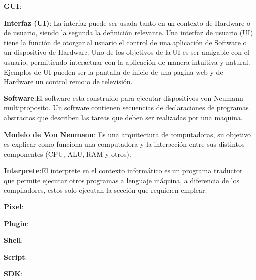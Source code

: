 \textbf{GUI}:

\textbf{Interfaz (UI)}: La interfaz puede ser usada tanto en un contexto de Hardware o de usuario, siendo la segunda la definición relevante.
Una interfaz de usuario (UI) tiene la función de otorgar al usuario el control de una aplicación de Software o un dispositivo de Hardware. Uno de los objetivos de la UI es ser amigable con el usuario, permitiendo interactuar con la aplicación de manera intuitiva y natural. Ejemplos de UI pueden ser la pantalla de inicio de una pagina web y de Hardware un control remoto de televisión.

\textbf{Software}:El software esta construido para ejecutar dispositivos von Neumann multiproposito. Un software contienen secuencias de declaraciones de programas abstractos que describen las tareas que deben ser realizadas por una maquina. 

\textbf{Modelo de Von Neumann}: Es una arquitectura de computadoras, su objetivo es explicar como funciona una computadora y la interacción entre sus distintos componentes (CPU, ALU, RAM y otros).

\textbf{Interprete}:El interprete en el contexto informático es un programa traductor que permite ejecutar otros programas a lenguaje máquina, a diferencia de los compiladores, estos solo ejecutan la sección que requieren emplear.


\textbf{Pixel}:



\textbf{Plugin}:

\textbf{Shell}:

\textbf{Script}:

\textbf{SDK}:



